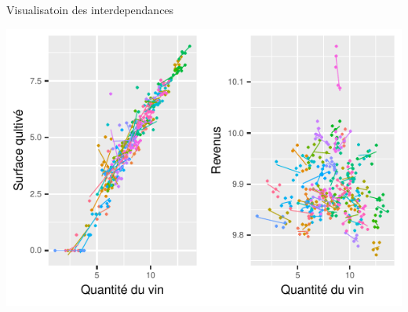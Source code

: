 \documentclass[11pt,ignorenonframetext,]{beamer}
\begin{document}
\begin{frame}{Visualisatoin des interdependances}
\protect\hypertarget{visualisatoin-des-interdependances-1}{}

\tiny

\begin{center}\includegraphics{Presentation_files/figure-beamer/unnamed-chunk-18-1} \end{center}

\normalsize

\end{frame}
\end{document}
